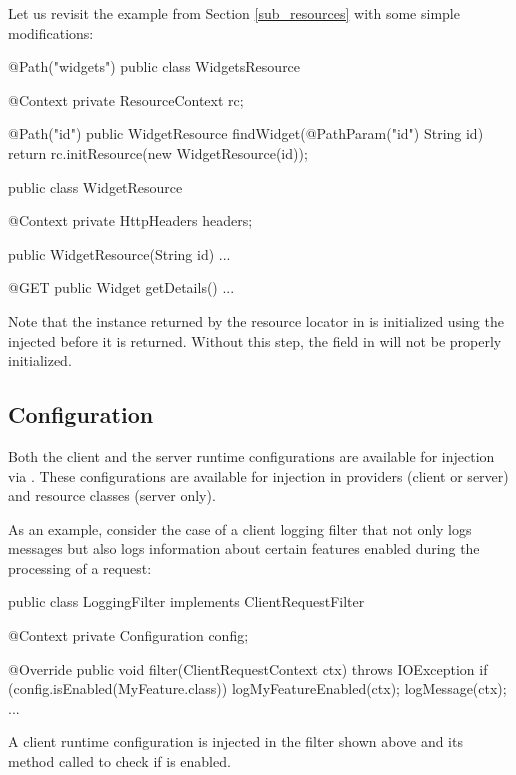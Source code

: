 Let us revisit the example from Section \ref{sub_resources} with some simple modifications:

\begin{listing}{1}
@Path("widgets")
public class WidgetsResource {
  @Context 
  private ResourceContext rc;
  
  @Path("{id}")
  public WidgetResource findWidget(@PathParam("id") String id) {
    return rc.initResource(new WidgetResource(id));
  }
}

public class WidgetResource {
  @Context 
  private HttpHeaders headers;

  public WidgetResource(String id) {...}

  @GET
  public Widget getDetails() {...}
}
\end{listing}

Note that the instance returned by the resource locator  in  is initialized using the injected  before it is returned. Without this step, the  field in  will not be properly initialized.

\subsection{Configuration}
\label{configuration_injection}

Both the client and the server runtime configurations are available for injection via \Context. These configurations are available for injection in providers (client or server) and resource classes (server only). 

As an example, consider the case of a client logging filter that not only logs messages but also logs information about certain features enabled during the processing of a request:

\begin{listing}{1}
public class LoggingFilter implements ClientRequestFilter {

  @Context
  private Configuration config;

  @Override
  public void filter(ClientRequestContext ctx) throws IOException {
    if (config.isEnabled(MyFeature.class)) {
      logMyFeatureEnabled(ctx);
    }
    logMessage(ctx);
  }
  ...
}
\end{listing}

A client runtime configuration is injected in the filter shown above and its  method called to check if  is enabled.
